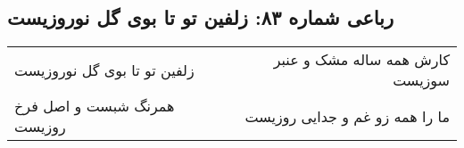 \begin{center}
\section*{رباعی شماره ۸۳: زلفین تو تا بوی گل نوروزیست}
\label{sec:sh083}
\begin{longtable}{l p{0.5cm} r}
زلفین تو تا بوی گل نوروزیست
&&
کارش همه ساله مشک و عنبر سوزیست
\\
همرنگ شبست و اصل فرخ روزیست
&&
ما را همه زو غم و جدایی روزیست
\\
\end{longtable}
\end{center}
